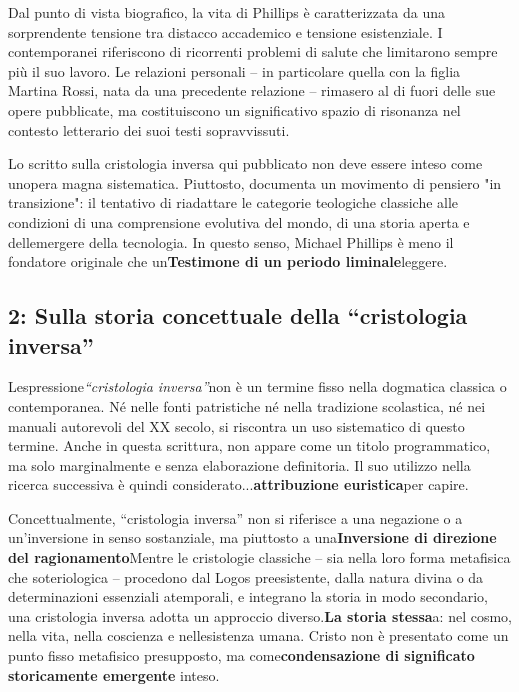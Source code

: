 \documentclass[
]{article}
\begin{document}
Dal punto di vista biografico, la vita di Phillips è caratterizzata da una sorprendente tensione tra distacco accademico e tensione esistenziale. I contemporanei riferiscono di ricorrenti problemi di salute che limitarono sempre più il suo lavoro. Le relazioni personali -- in particolare quella con la figlia Martina Rossi, nata da una precedente relazione -- rimasero al di fuori delle sue opere pubblicate, ma costituiscono un significativo spazio di risonanza nel contesto letterario dei suoi testi sopravvissuti.

Lo scritto sulla cristologia inversa qui pubblicato non deve essere inteso come un\textquotesingle opera magna sistematica. Piuttosto, documenta un movimento di pensiero "in transizione": il tentativo di riadattare le categorie teologiche classiche alle condizioni di una comprensione evolutiva del mondo, di una storia aperta e dell\textquotesingle emergere della tecnologia. In questo senso, Michael Phillips è meno il fondatore originale che un\textbf{Testimone di un periodo liminale}leggere.

\subsection{2: Sulla storia concettuale della ``cristologia inversa''}\label{sulla-storia-concettuale-della-cristologia-inversa}

L\textquotesingle espressione\emph{``cristologia inversa''}non è un termine fisso nella dogmatica classica o contemporanea. Né nelle fonti patristiche né nella tradizione scolastica, né nei manuali autorevoli del XX secolo, si riscontra un uso sistematico di questo termine. Anche in questa scrittura, non appare come un titolo programmatico, ma solo marginalmente e senza elaborazione definitoria. Il suo utilizzo nella ricerca successiva è quindi considerato...\textbf{attribuzione euristica}per capire.

Concettualmente, ``cristologia inversa'' non si riferisce a una negazione o a un'inversione in senso sostanziale, ma piuttosto a una\textbf{Inversione di direzione del ragionamento}Mentre le cristologie classiche -- sia nella loro forma metafisica che soteriologica -- procedono dal Logos preesistente, dalla natura divina o da determinazioni essenziali atemporali, e integrano la storia in modo secondario, una cristologia inversa adotta un approccio diverso.\textbf{La storia stessa}a: nel cosmo, nella vita, nella coscienza e nell\textquotesingle esistenza umana. Cristo non è presentato come un punto fisso metafisico presupposto, ma come\textbf{condensazione di significato storicamente emergente} inteso.
\end{document}
